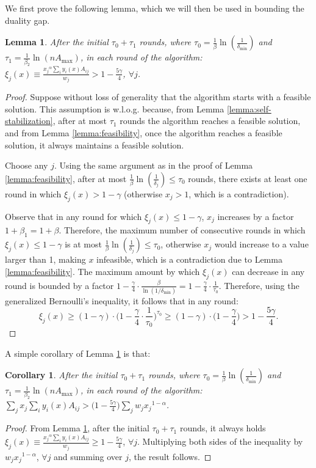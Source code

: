 \documentclass[11pt]{article}
\newtheorem{lemma}[theorem]{Lemma}
\newtheorem{corollary}[theorem]{Corollary}
\begin{document}
We first prove the following lemma, which we will then be used in bounding the duality gap.
\begin{lemma}\label{lemma:alpha<1-lower-bound-xi-j}
After the initial $\tau_0 + \tau_1$ rounds, where $\tau_0 = \frac{1}{\beta}\ln(\frac{1}{\delta_{\min}})$ and $\tau_1 = \frac{1}{\beta_2}\ln(nA_{\max})$, in each round of the algorithm: $\xi_j(x)\equiv \frac{{x_j}^{\alpha}\sum_iy_i(x)A_{ij}}{w_j} > 1-\frac{5\gamma}{4}$, $\forall j$.
\end{lemma}
\begin{proof}
Suppose without loss of generality that the algorithm starts with a feasible solution. This assumption is w.l.o.g. because, from Lemma \ref{lemma:self-stabilization}, after at most $\tau_1$ rounds the algorithm reaches a feasible solution, and from Lemma \ref{lemma:feasibility}, once the algorithm reaches a feasible solution, it always maintains a feasible solution. 

Choose any $j$. Using the same argument as in the proof of Lemma \ref{lemma:feasibility}, after at most $\frac{1}{\beta}\ln(\frac{1}{\delta_j})\leq \tau_0$ rounds, there exists at least one round in which $\xi_j(x) > 1- \gamma$ (otherwise $x_j>1$, which is a contradiction).

Observe that in any round for which $\xi_j(x) \leq 1- \gamma$, $x_j$ increases by a factor $1+\beta_1 = 1+\beta$. Therefore, the maximum number of consecutive rounds in which $\xi_j(x) \leq 1-\gamma$ is at most $\frac{1}{\beta}\ln(\frac{1}{\delta_j})\leq \tau_0$, otherwise $x_j$ would increase to a value larger than 1, making $x$ infeasible, which is a contradiction due to Lemma \ref{lemma:feasibility}. The maximum amount by which $\xi_j(x)$ can decrease in any round is bounded by a factor $1-\frac{\gamma}{4}\cdot \frac{\beta}{\ln(1/\delta_{\min})} = 1-\frac{\gamma}{4}\cdot \frac{1}{\tau_0}$. Therefore, using the generalized Bernoulli's inequality, it follows that in any round:
\begin{equation*}
\xi_j(x) \geq (1-\gamma)\cdot \Big(1-\frac{\gamma}{4}\cdot \frac{1}{\tau_0}\Big)^{\tau_0}\geq (1-\gamma)\cdot \Big(1-\frac{\gamma}{4}\Big)>1 - \frac{5\gamma}{4}.
\end{equation*}
\end{proof}
A simple corollary of Lemma \ref{lemma:alpha<1-lower-bound-xi-j} is that:
\begin{corollary}\label{cor:alpha<1-lower-comp}
After the initial $\tau_0 + \tau_1$ rounds, where $\tau_0 = \frac{1}{\beta}\ln(\frac{1}{\delta_{\min}})$ and $\tau_1 = \frac{1}{\beta_2}\ln(nA_{\max})$, in each round of the algorithm: $\sum_j x_j \sum_i y_i(x)A_{ij} > \big(1 - \frac{5\gamma}{4}\big)\sum_j w_j {x_j}^{1-\alpha}$.
\end{corollary}
\begin{proof}
From Lemma \ref{lemma:alpha<1-lower-bound-xi-j}, after the initial $\tau_0 + \tau_1$ rounds, it always holds $\xi_j(x) \equiv \frac{{x_j}^{\alpha}\sum_i y_i(x)A_{ij}}{w_j}\geq 1-\frac{5\gamma}{4}$, $\forall j$. Multiplying both sides of the inequality by $w_j {x_j}^{1-\alpha}$, $\forall j$ and summing over $j$, the result follows.
\end{proof}
\end{document}
